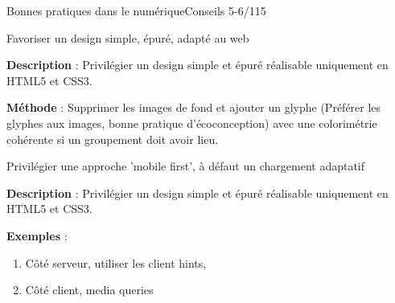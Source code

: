 \begin{frame}{Bonnes pratiques dans le numérique}{Conseils 5-6/115}

\begin{block}{Favoriser un design simple, épuré, adapté au web}

\textbf{Description} : Privilégier un design simple et épuré réalisable uniquement en HTML5 et CSS3.

\textbf{Méthode} :
 Supprimer les images de fond et ajouter un glyphe (Préférer les glyphes aux images, bonne pratique d'écoconception) avec une colorimétrie cohérente si un groupement doit avoir lieu.

\end{block}


\begin{block}{Privilégier une approche 'mobile first', à défaut un chargement adaptatif}

\textbf{Description} : Privilégier un design simple et épuré réalisable uniquement en HTML5 et CSS3.

\textbf{Exemples} :
\begin{enumerate}
    \item Côté serveur, utiliser les client hints,
    \item Côté client, media queries 
\end{enumerate}

\end{block}


\end{frame}



